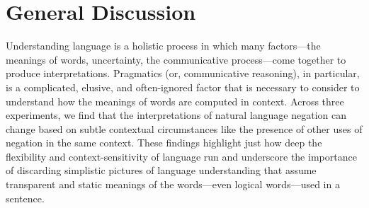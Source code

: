 \documentclass[floatsintext,doc]{apa6}
\newcommand{\ourmodel}{Flexible Negation\xspace}
\begin{document}
\section{General Discussion}\label{discussion}


Understanding language is a holistic process in which many factors---the meanings of words, uncertainty, the communicative process---come together to produce interpretations. Pragmatics (or, communicative reasoning), in particular, is a complicated, elusive, and often-ignored factor that is necessary to consider to understand how the meanings of words are computed in context. 
Across three experiments, we find that the interpretations of natural language negation can change based on subtle contextual circumstances like the presence of other uses of negation in the same context.
These findings highlight just how deep the flexibility and context-sensitivity of language run and underscore the importance of discarding simplistic pictures of language understanding that assume transparent and static meanings of the words---even logical words---used in a sentence. 

\end{document}
